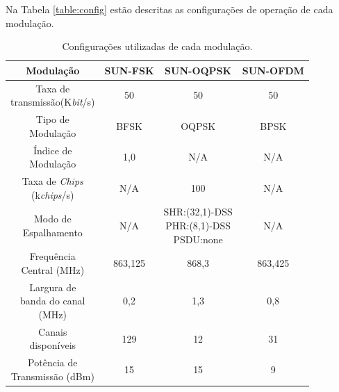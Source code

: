 Na Tabela \ref{table:config} estão descritas as configurações de operação de cada modulação.
\begin{table}[H]
  \centering
  \caption{Configurações utilizadas de cada modulação.}
  \begin{tabular}{|c c c c|}
    \hline
    Modulação & SUN-FSK        & SUN-OQPSK         & SUN-OFDM \\ [0.5ex]
    \hline\hline
    \makecell{Taxa de                                         \\transmissão(K\emph{bit}/s)    } & 50      & 50                       & 50       \\\hline
    \makecell{Tipo de                                         \\Modulação                     } & BFSK    & OQPSK                    & BPSK     \\\hline
    \makecell{Índice de                                       \\Modulação                   } & 1,0     & N/A                      & N/A      \\\hline
    \makecell{Taxa de \emph{Chips}                            \\(k\emph{chips}/s) } &   N/A      & 100                      & N/A      \\\hline
    \makecell{Modo de                                         \\Espalhamento                  } & N/A     & \makecell{SHR:(32,1)-DSS            \\ PHR:(8,1)-DSS\\ PSDU:none} & N/A      \\\hline
    \makecell{Frequência                                      \\Central (MHz)              } & 863,125   & 868,3                      & 863,425    \\\hline
    \makecell{Largura de                                      \\banda do canal                                                               \\(MHz)        } & 0,2     & 1,3                     & 0,8      \\\hline
    \makecell{Canais                                          \\disponíveis                    } & 129     & 12                       & 31       \\\hline
    \makecell{Potência de                                     \\Transmissão (dBm)         } & 15      & 15                       & 9        \\\hline

\end{tabular}
\end{table}
